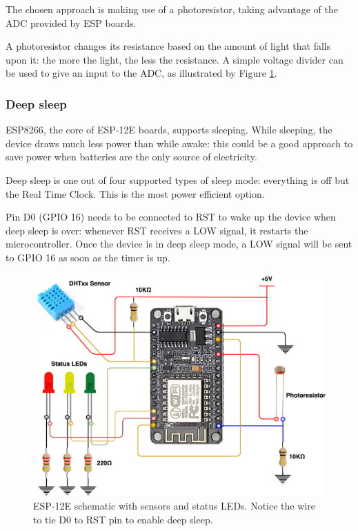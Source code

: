 The chosen approach is making use of a photoresistor, taking advantage of the ADC provided by ESP boards.

A photoresistor changes its resistance based on the amount of light that falls upon it: the more the light, the less the resistance. A simple voltage divider can be used to give an input to the ADC, as illustrated by Figure \ref{esp12_wiring}.

\subsubsection{Deep sleep}
ESP8266, the core of ESP-12E boards, supports sleeping. While sleeping, the device draws much less power than while awake: this could be a good approach to save power when batteries are the only source of electricity.

Deep sleep is one out of four supported types of sleep mode: everything is off but the Real Time Clock. This is the most power efficient option.

Pin D0 (GPIO 16) needs to be connected to RST to wake up the device when deep sleep is over: whenever RST receives a LOW signal, it restarts the microcontroller. Once the device is in deep sleep mode, a LOW signal will be sent to GPIO 16 as soon as the timer is up.

\begin{figure}[H]
	\begin{center}
		\includegraphics[width=\textwidth]{./pictures/ESP-12E_wiring.png}
		\caption{ESP-12E schematic with sensors and status LEDs. Notice the wire to tie D0 to RST pin to enable deep sleep.}
		\label{esp12_wiring}
	\end{center}
\end{figure}

